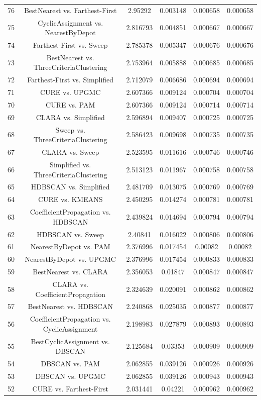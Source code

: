 \documentclass[a4paper,10pt]{article}
\begin{document}
\begin{landscape}
\begin{table}[!htp]
\begin{tabular}{cccccc}
76&BestNearest vs. Farthest-First&2.95292&0.003148&0.000658&0.000658\\
75&CyclicAssignment vs. NearestByDepot&2.816793&0.004851&0.000667&0.000667\\
74&Farthest-First vs. Sweep&2.785378&0.005347&0.000676&0.000676\\
73&BestNearest vs. ThreeCriteriaClustering&2.753964&0.005888&0.000685&0.000685\\
72&Farthest-First vs. Simplified&2.712079&0.006686&0.000694&0.000694\\
71&CURE vs. UPGMC&2.607366&0.009124&0.000704&0.000704\\
70&CURE vs. PAM&2.607366&0.009124&0.000714&0.000714\\
69&CLARA vs. Simplified&2.596894&0.009407&0.000725&0.000725\\
68&Sweep vs. ThreeCriteriaClustering&2.586423&0.009698&0.000735&0.000735\\
67&CLARA vs. Sweep&2.523595&0.011616&0.000746&0.000746\\
66&Simplified vs. ThreeCriteriaClustering&2.513123&0.011967&0.000758&0.000758\\
65&HDBSCAN vs. Simplified&2.481709&0.013075&0.000769&0.000769\\
64&CURE vs. KMEANS&2.450295&0.014274&0.000781&0.000781\\
63&CoefficientPropagation vs. HDBSCAN&2.439824&0.014694&0.000794&0.000794\\
62&HDBSCAN vs. Sweep&2.40841&0.016022&0.000806&0.000806\\
61&NearestByDepot vs. PAM&2.376996&0.017454&0.00082&0.00082\\
60&NearestByDepot vs. UPGMC&2.376996&0.017454&0.000833&0.000833\\
59&BestNearest vs. CLARA&2.356053&0.01847&0.000847&0.000847\\
58&CLARA vs. CoefficientPropagation&2.324639&0.020091&0.000862&0.000862\\
57&BestNearest vs. HDBSCAN&2.240868&0.025035&0.000877&0.000877\\
56&CoefficientPropagation vs. CyclicAssignment&2.198983&0.027879&0.000893&0.000893\\
55&BestCyclicAssignment vs. DBSCAN&2.125684&0.03353&0.000909&0.000909\\
54&DBSCAN vs. PAM&2.062855&0.039126&0.000926&0.000926\\
53&DBSCAN vs. UPGMC&2.062855&0.039126&0.000943&0.000943\\
52&CURE vs. Farthest-First&2.031441&0.04221&0.000962&0.000962\\

\end{tabular}
\end{table}
\end{landscape}
\end{document}
